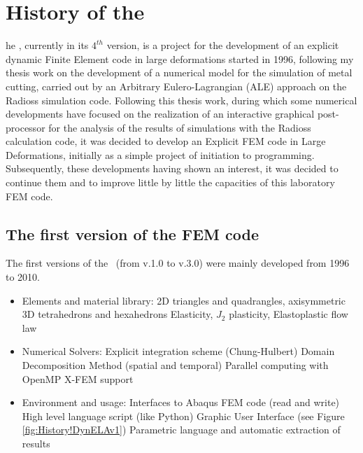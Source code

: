 %
%
%
\chapter{History of the \DynELA}\label{Chapter!History}

\startcontents[chapters]
\printmyminitoc[1]he \DynELA, currently in its $4^{th}$ version, is a project for the development of an explicit dynamic Finite Element code in large deformations started in 1996, following my thesis work on the development of a numerical model for the simulation of metal cutting, carried out by an Arbitrary Eulero-Lagrangian (ALE) approach on the Radioss simulation code. Following this thesis work, during which some numerical developments have focused on the realization of an interactive graphical post-processor for the analysis of the results of simulations with the Radioss calculation code, it was decided to develop an Explicit FEM code in Large Deformations, initially as a simple project of initiation to programming. Subsequently, these developments having shown an interest, it was decided to continue them and to improve little by little the capacities of this laboratory FEM code.

\section{The first version of the FEM code}
The first versions of the \DynELA~(from v.1.0 to v.3.0) were mainly developed from 1996 to 2010.
\begin{itemize}
\item Elements and material library:
\subitem 2D triangles and quadrangles, axisymmetric
\subitem 3D tetrahedrons and hexahedrons
\subitem Elasticity, $J_{2}$ plasticity, Elastoplastic flow law
\item Numerical Solvers:
\subitem Explicit integration scheme (Chung-Hulbert)
\subitem Domain Decomposition Method (spatial and temporal)
\subitem Parallel computing with OpenMP
\subitem X-FEM support
\item Environment and usage:
\subitem Interfaces to Abaqus FEM code (read and write)
\subitem High level language script (like Python)
\subitem Graphic User Interface (see Figure \ref{fig:History!DynELAv1})
\subitem Parametric language and automatic extraction of results
\end{itemize}


